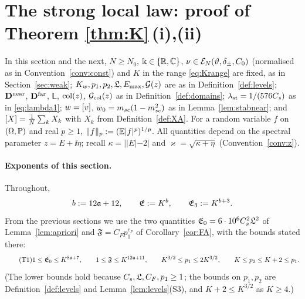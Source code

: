 \section{The strong local law: proof of Theorem \ref{thm:K}\,(i),(ii)}\label{sec:strong}
In this section and the next, $N\ge N_0$, $\Bbbk\in\{\mathbb{R},\mathbb{C}\}$, $\nu\in\mathcal E_N(\vartheta,\delta_\pm,C_0)$ (normalised as in Convention~\ref{conv:const}) and $K$ in the range \eqref{eq:Krange} are fixed, as in Section~\ref{sec:weak};
$K_w,p_1,p_2,\mathfrak{L},E_{\max},\mathcal{G}(z)$ are as in Definition~\ref{def:levels}; $\mathbf{D}^{\rm near}$, $\mathbf{D}^{\rm far}$, $\mathbb L$, ${\rm col}(z)$, $\mathcal{G}_{\rm col}(z)$ as in Definition~\ref{def:domains};
$\lambda_{\rm st}=1/(576C_s)$ as in \eqref{eq:lambda1}; $w=[v]$, $w_0=m_{sc}(1-m_{sc}^2)$ as in Lemma~\ref{lem:stabnear}; and $[X]=\frac1N\sum_kX_k$ with $X_k$ from Definition~\ref{def:XA}.
For a random variable $f$ on $(\Omega,\mathbb{P})$ and real $p\ge1$, $\|f\|_p:=(\mathbb{E}|f|^p)^{1/p}$. All quantities depend on the spectral parameter $z=E+\ii\eta$; recall $\kappa=||E|-2|$ and $\varkappa=\sqrt{\kappa+\eta}$ (Convention~\ref{conv:z}).

\paragraph{Exponents of this section.} Throughout,
\[
 b:=12\mathfrak{a}+12,\qquad\mathfrak E:=K^{b},\qquad\mathfrak E_3:=K^{b+3}.
\]
From the previous sections we use the two quantities $\mathfrak E_0=6\cdot10^6C_s^2\mathfrak{L}^2$ of Lemma~\ref{lem:apriori} and $\mathfrak F=C_Fp_1^{c_F}$ of Corollary~\ref{cor:FA}, with the bounds stated there:
\begin{equation}\tag{T1}\label{eq:a5-T1}
 1\le\mathfrak E_0\le K^{8\mathfrak{a}+7},\qquad1\le\mathfrak F\le K^{12\mathfrak{a}+11},\qquad K^{3/2}\le p_1\le2K^{3/2},\qquad K\le p_2\le K+2\le p_1 .
\end{equation}
(The lower bounds hold because $C_s,\mathfrak{L},C_F,p_1\ge1$; the bounds on $p_1,p_2$ are Definition~\ref{def:levels} and Lemma~\ref{lem:levels}(S3), and $K+2\le K^{3/2}$ as $K\ge4$.)

